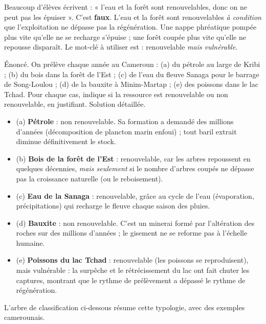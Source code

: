 \documentclass[11pt]{article}
\begin{document}
\begin{attention}
Beaucoup d'élèves écrivent : « l'eau et la forêt sont renouvelables, donc on ne peut pas les épuiser ». C'est \textbf{faux}. L'eau et la forêt sont renouvelables \emph{à condition} que l'exploitation ne dépasse pas la régénération. Une nappe phréatique pompée plus vite qu'elle ne se recharge s'épuise ; une forêt coupée plus vite qu'elle ne repousse disparaît. Le mot-clé à utiliser est : renouvelable \emph{mais vulnérable}.
\end{attention}

\begin{exoresolu}
Énoncé. On prélève chaque année au Cameroun : (a) du pétrole au large de Kribi ; (b) du bois dans la forêt de l'Est ; (c) de l'eau du fleuve Sanaga pour le barrage de Song-Loulou ; (d) de la bauxite à Minim-Martap ; (e) des poissons dans le lac Tchad. Pour chaque cas, indique si la ressource est renouvelable ou non renouvelable, en justifiant.
\tcblower
Solution détaillée.
\begin{itemize}
\item (a) \textbf{Pétrole} : non renouvelable. Sa formation a demandé des millions d'années (décomposition de plancton marin enfoui) ; tout baril extrait diminue définitivement le stock.
\item (b) \textbf{Bois de la forêt de l'Est} : renouvelable, car les arbres repoussent en quelques décennies, \emph{mais seulement} si le nombre d'arbres coupés ne dépasse pas la croissance naturelle (ou le reboisement).
\item (c) \textbf{Eau de la Sanaga} : renouvelable, grâce au cycle de l'eau (évaporation, précipitations) qui recharge le fleuve chaque saison des pluies.
\item (d) \textbf{Bauxite} : non renouvelable. C'est un minerai formé par l'altération des roches sur des millions d'années ; le gisement ne se reforme pas à l'échelle humaine.
\item (e) \textbf{Poissons du lac Tchad} : renouvelable (les poissons se reproduisent), mais vulnérable : la surpêche et le rétrécissement du lac ont fait chuter les captures, montrant que le rythme de prélèvement a dépassé le rythme de régénération.
\end{itemize}
\end{exoresolu}

L'arbre de classification ci-dessous résume cette typologie, avec des exemples camerounais.
\end{document}
